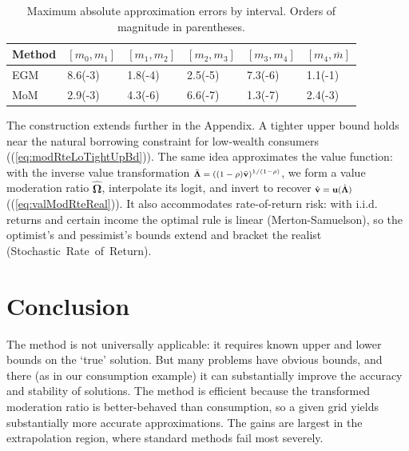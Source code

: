 \documentclass[preprint,authoryear]{elsarticle}
\newcommand{\CRRA}{\rho}
\newcommand{\uFunc}{\mathbf{u}}
\newcommand{\vFunc}{\mathbf{v}}
\newcommand{\vFuncOpt}{\bar{\vFunc}}
\newcommand{\vInv}{{\scriptsize \boldsymbol{\Lambda}}}
\newcommand{\vInvOpt}{\bar{\vInv}}
\newcommand{\valModRte}{\boldsymbol{\Omega}}
\newcommand{\valModRteReal}{\hat{\valModRte}}
\newcommand{\vFuncReal}{\hat{\vFunc}}
\newcommand{\vInvReal}{\hat{\vInv}}
\begin{document}
\begin{table}
\centering
\caption[]{Maximum absolute approximation errors by interval. Orders of magnitude in parentheses.}
\label{tbl:approx-errors}
\begin{tabular}{p{}p{}p{}p{}p{}p{}}
\toprule
Method & $[m_0,m_1]$ & $[m_1,m_2]$ & $[m_2,m_3]$ & $[m_3,m_4]$ & $[m_4,\overline{m}]$ \\
\hline
EGM & 8.6(-3) & 1.8(-4) & 2.5(-5) & 7.3(-6) & 1.1(-1) \\
MoM & 2.9(-3) & 4.3(-6) & 6.6(-7) & 1.3(-7) & 2.4(-3) \\
\bottomrule
\end{tabular}
\end{table}

The construction extends further in the Appendix. A tighter upper bound holds near the natural borrowing constraint for low-wealth consumers ((\ref{eq:modRteLoTightUpBd})). The same idea approximates the value function: with the inverse value transformation $\vInvOpt = \left((1 -\CRRA)\vFuncOpt\right)^{1/(1 -\CRRA)}$, we form a value moderation ratio $\valModRteReal$, interpolate its logit, and invert to recover $\vFuncReal = \uFunc(\vInvReal)$ ((\ref{eq:valModRteReal})). It also accommodates rate-of-return risk: with i.i.d. returns and certain income the optimal rule is linear (Merton-Samuelson), so the optimist's and pessimist's bounds extend and bracket the realist (Stochastic~Rate~of~Return).

\section{Conclusion}

The method is not universally applicable: it requires known upper and lower bounds on the `true' solution. But many problems have obvious bounds, and there (as in our consumption example) it can substantially improve the accuracy and stability of solutions. The method is efficient because the transformed moderation ratio is better-behaved than consumption, so a given grid yields substantially more accurate approximations. The gains are largest in the extrapolation region, where standard methods fail most severely.



\end{document}
